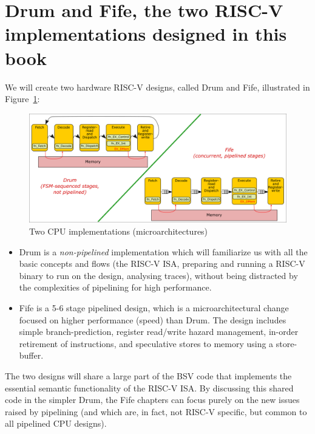 
\section{Drum and Fife, the two RISC-V implementations designed in this book}

We will create two hardware RISC-V designs, called Drum and Fife,
illustrated in Figure~\ref{Fig_Two_Microarchitectures}:
\begin{figure}[htbp]
  \centerline{\includegraphics[width=6in,angle=0]{Figures/Fig_Two_Microarchitectures}}
  \caption{\label{Fig_Two_Microarchitectures}Two CPU implementations (microarchitectures)}
\end{figure}

\begin{itemize}

  \item Drum is a \emph{non-pipelined} implementation which will
        familiarize us with all the basic concepts and flows (the
        RISC-V ISA, preparing and running a RISC-V binary to run on
        the design, analysing traces), without being distracted by the
        complexities of pipelining for high performance.

  \item Fife is a 5-6 stage pipelined design, which is a
        microarchitectural change focused on higher performance
        (speed) than Drum. The design includes simple
        branch-prediction, register read/write hazard management,
        in-order retirement of instructions, and speculative stores to
        memory using a store-buffer.

\end{itemize}

The two designs will share a large part of the BSV code that
implements the essential semantic functionality of the RISC-V ISA.  By
discussing this shared code in the simpler Drum, the Fife chapters can
focus purely on the new issues raised by pipelining (and which are, in
fact, not RISC-V specific, but common to all pipelined CPU designs).

